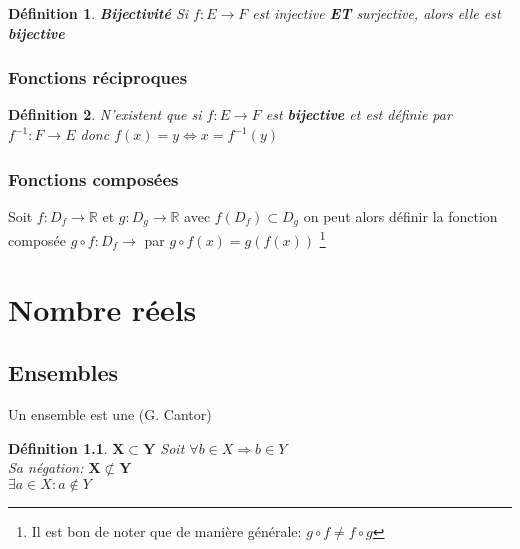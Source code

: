 \documentclass[10pt,a4paper]{book}
\newcommand{\R}{\mathbb{R}}
\newtheorem{definition}{Définition}[section]
\begin{document}
\begin{definition} \textbf{Bijectivité}
Si $f: E \rightarrow F$ est injective \textbf{ET} surjective, alors elle est \textbf{bijective}
\end{definition}

\subsection{Fonctions réciproques}

\begin{definition}
N'existent que si $f: E \rightarrow F$ est \textbf{bijective} et est définie par $f^{-1}: F \rightarrow E$ donc $f(x) = y \Leftrightarrow x = f^{-1}(y)$
\end{definition}

\subsection{Fonctions composées}

Soit $f: D_f \rightarrow \R$ et $g: D_g \rightarrow \R$ avec $f(D_f) \subset D_g$ on peut alors définir la fonction composée $g\circ f : D_f \rightarrow$ par $g\circ f(x) = g(f(x))$ \footnote{Il est bon de noter que de manière générale: $g\circ f \neq f\circ g$}

\chapter{Nombre réels}

\section{Ensembles}

Un ensemble est une  (G. Cantor) 

\begin{definition} $\mathbf{X \subset Y}$
Soit $\forall b \in X \Rightarrow b \in Y$ \\
Sa négation: $\mathbf{X \not\subset Y}$ \\
$\exists a \in X: a \notin Y$

\end{definition}
\end{document}
